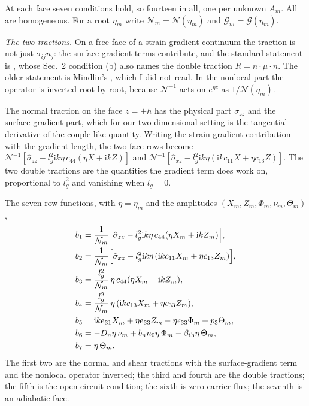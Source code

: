 \documentclass[11pt]{article}
\makeatletter
\newif\ifshowworked
\newenvironment{worked}{%
  \ifshowworked\par\smallskip\noindent\textit{Working.}\par\smallskip\else
  \setbox\z@\vbox\bgroup\fi}{\ifshowworked\par\smallskip\else\egroup\fi}
\newcommand{\ii}{\mathrm{i}}
\newcommand{\Ncal}{\mathcal{N}}
\newcommand{\Gcal}{\mathcal{G}}
\makeatother
\begin{document}
At each face seven conditions hold, so fourteen in all, one per unknown $A_m$. All are homogeneous. For a
root $\eta_m$ write $\Ncal_m=\Ncal(\eta_m)$ and $\Gcal_m=\Gcal(\eta_m)$.

\emph{The two tractions.} On a free face of a strain-gradient continuum the traction is not just
$\sigma_{ij}n_j$: the surface-gradient terms contribute, and the standard statement is
\cite[Sec.~2, Eq.~(14)]{Charal2019}, whose Sec.~2 condition (b) also names the double traction
$R=n\cdot\mu\cdot n$. The older statement is Mindlin's \cite{Mindlin1964}, which I did not read. In the
nonlocal part the operator is inverted root by root, because $\Ncal^{-1}$ acts on $e^{\eta z}$ as
$1/\Ncal(\eta_m)$.

\begin{worked}
The normal traction on the face $z=+h$ has the physical part $\sigma_{zz}$ and the surface-gradient part,
which for our two-dimensional setting is the tangential derivative of the couple-like quantity. Writing
the strain-gradient contribution with the gradient length, the two face rows become
$\Ncal^{-1}[\hat\sigma_{zz}-l_g^2\ii k\eta\,c_{44}(\eta X+\ii kZ)]$ and
$\Ncal^{-1}[\hat\sigma_{xz}-l_g^2\ii k\eta(\ii k c_{11}X+\eta c_{13}Z)]$. The two double tractions are
the quantities the gradient term does work on, proportional to $l_g^2$ and vanishing when $l_g=0$.
\end{worked}

The seven row functions, with $\eta=\eta_m$ and the amplitudes $(X_m,Z_m,\Phi_m,\nu_m,\Theta_m)$,
\begin{align}
b_1&=\frac{1}{\Ncal_m}\Bigl[\hat\sigma_{zz}-l_g^2\ii k\eta\,c_{44}(\eta X_m+\ii kZ_m)\Bigr], \\
b_2&=\frac{1}{\Ncal_m}\Bigl[\hat\sigma_{xz}-l_g^2\ii k\eta\,(\ii k c_{11}X_m+\eta c_{13}Z_m)\Bigr], \\
b_3&=\frac{l_g^2}{\Ncal_m}\,\eta\,c_{44}(\eta X_m+\ii kZ_m), \\
b_4&=\frac{l_g^2}{\Ncal_m}\,\eta\,(\ii k c_{13}X_m+\eta c_{33}Z_m), \\
b_5&=\ii k e_{31}X_m+\eta e_{33}Z_m-\eta\epsilon_{33}\Phi_m+p_3\Theta_m, \\
b_6&=-D_n\eta\,\nu_m+b_nn_0\eta\,\Phi_m-\beta_{\rm th}\eta\,\Theta_m, \\
b_7&=\eta\,\Theta_m .
\end{align}
The first two are the normal and shear tractions with the surface-gradient term and the nonlocal operator
inverted; the third and fourth are the double tractions; the fifth is the open-circuit condition; the
sixth is zero carrier flux; the seventh is an adiabatic face.
\end{document}
